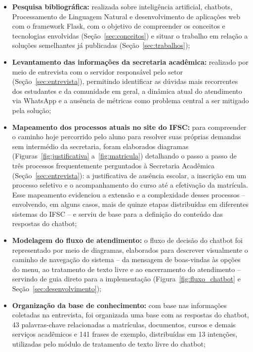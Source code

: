 \documentclass[12pt]{article}
\begin{document}
\begin{itemize}
  

  \item \textbf{Pesquisa bibliográfica:} realizada sobre inteligência
  artificial, chatbots, Processamento de Linguagem Natural e
  desenvolvimento de aplicações web com o framework Flask, com o objetivo
  de compreender os conceitos e tecnologias envolvidas (Seção~\ref{sec:conceitos}) e situar
  o trabalho em relação a soluções semelhantes já publicadas (Seção~\ref{sec:trabalhos});

  \item \textbf{Levantamento das informações da secretaria acadêmica:}
  realizado por meio de entrevista com o servidor responsável pelo setor
  (Seção~\ref{sec:entrevista}), permitindo identificar as dúvidas mais recorrentes dos
  estudantes e da comunidade em geral, a dinâmica atual do atendimento via WhatsApp e a ausência
  de métricas como problema central a ser mitigado pela solução;

  \item \textbf{Mapeamento dos processos atuais no site do IFSC:} para
  compreender o caminho hoje percorrido pelo aluno para resolver suas
  próprias demandas sem intermédio da secretaria, foram elaborados diagramas (Figuras~\ref{fig:justificativa} a~\ref{fig:matricula}) detalhando o passo a passo de três processos frequentemente
  perguntados à Secretaria Acadêmica (Seção~\ref{sec:entrevista}): a justificativa de
  ausência escolar, a inscrição em um processo seletivo e o
  acompanhamento do curso até a efetivação da matrícula. Esse mapeamento
  evidenciou a extensão e a complexidade desses processos -- envolvendo,
  em alguns casos, mais de quinze etapas distribuídas em diferentes
  sistemas do IFSC -- e serviu de base para a definição do conteúdo das
  respostas do chatbot;

  \item \textbf{Modelagem do fluxo de atendimento:} o fluxo de decisão do
  chatbot foi representado por meio de diagramas, elaborados para
  descrever visualmente o caminho de navegação do sistema -- da mensagem
  de boas-vindas às opções do menu, ao tratamento de texto livre e ao
  encerramento do atendimento -- servindo de guia direto para a implementação (Figura~\ref{fig:fluxo_chatbot} e Seção~\ref{sec:desenvolvimento});

  \item \textbf{Organização da base de conhecimento:} com base nas
  informações coletadas na entrevista, foi organizada uma base com as respostas do chatbot, 43 palavras-chave relacionadas a matrículas, documentos, cursos e demais serviços acadêmicos e 141 frases de exemplo, distribuídas em 13 intenções, utilizadas pelo módulo de tratamento de texto livre do chatbot;


\end{itemize}
\end{document}
